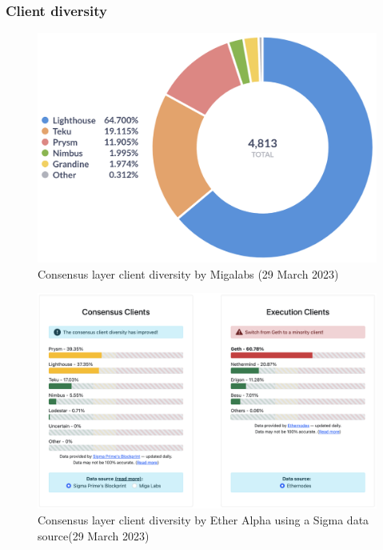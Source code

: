 \documentclass[UTF8]{article}
\begin{document}
\subsubsection*{Client diversity}
\begin{figure}[htbp]
\begin{center}
\includegraphics[width=0.4\linewidth]{images/clientdiversity}
\caption{Consensus layer client diversity by Migalabs (29 March 2023)}
\label{fig:migalabs}
\end{center}
\end{figure}

 \begin{figure}[htbp]
\begin{center}
\includegraphics[width=0.9\linewidth]{images/clientdiversitysigma}
\caption{Consensus layer client diversity by Ether Alpha using a Sigma data source(29 March 2023)}
\label{fig:sigmaprime}
\end{center}
\end{figure}
\end{document}

